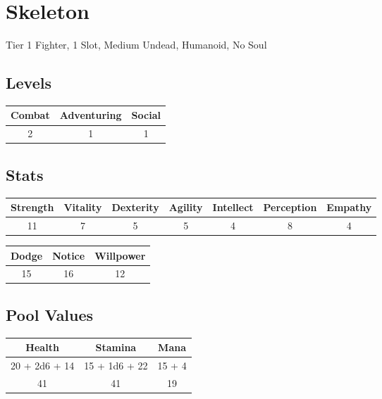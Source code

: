 \section{Skeleton}
Tier 1 Fighter, 1 Slot, Medium Undead, Humanoid, No Soul\\

\subsection{Levels}
\begin{minipage}[H]{1\textwidth}
    \centering
    \begin{tabular}[c]{|c | c | c|}
        \hline
        Combat & Adventuring & Social\\
        \hline
        2 & 1 & 1\\
        \hline
    \end{tabular}
\end{minipage}

\subsection{Stats}
\begin{minipage}[H]{1\textwidth}
    \centering
    \begin{tabular}[c]{|c | c | c | c | c | c | c|}
        \hline
        Strength & Vitality & Dexterity & Agility & Intellect & Perception & Empathy\\
        \hline
        11 & 7 & 5 & 5 & 4 & 8 & 4\\
        \hline
    \end{tabular}
\end{minipage}

\begin{minipage}[H]{1\textwidth}
    \centering
    \begin{tabular}[c]{|c | c | c|}
        \hline
        Dodge & Notice & Willpower\\
        \hline
        15 & 16 & 12\\
        \hline
    \end{tabular}
\end{minipage}

\subsection{Pool Values}
\begin{minipage}[H]{1\textwidth}
    \centering
    \begin{tabular}[c]{|c | c | c|}
        \hline
        Health & Stamina & Mana\\
        \hline
        20 + 2d6 + 14 & 15 + 1d6 + 22 & 15 + 4\\
        41 & 41 & 19\\
        \hline
    \end{tabular}
\end{minipage}


